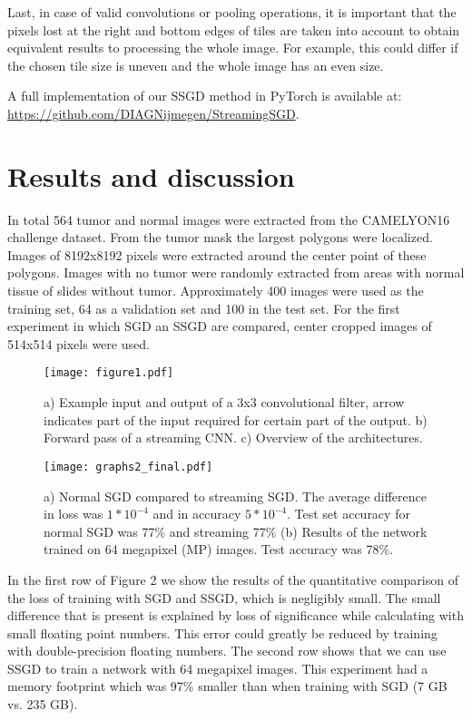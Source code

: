 \documentclass{article}
\begin{document}
Last, in case of valid convolutions or pooling operations, it is important that the pixels lost at the right and bottom edges of tiles are taken into account to obtain equivalent results to processing the whole image. For example, this could differ if the chosen tile size is uneven and the whole image has an even size.

A full implementation of our SSGD method in PyTorch is available at: \url{https://github.com/DIAGNijmegen/StreamingSGD}.

\section{Results and discussion}
In total 564 tumor and normal images were extracted from the CAMELYON16 challenge dataset\cite{doi:10.1001/jama.2017.14585}. From the tumor mask the largest polygons were localized. Images of 8192x8192 pixels were extracted around the center point of these polygons. Images with no tumor were randomly extracted from areas with normal tissue of slides without tumor. Approximately 400 images were used as the training set, 64 as a validation set and 100 in the test set. For the first experiment in which SGD an SSGD are compared, center cropped images of 514x514 pixels were used.

\begin{figure}[h]
    \centering
    \def\svgwidth{\columnwidth}
	\texttt{[image: figure1.pdf]}
    \caption{a) Example input and output of a 3x3 convolutional filter, arrow indicates part of the input required for certain part of the output. b) Forward pass of a streaming CNN. c) Overview of the architectures.}
\end{figure}

\begin{figure}[h]
    \centering
    \def\svgwidth{\columnwidth}
    \texttt{[image: graphs2\_final.pdf]}
    \caption{a) Normal SGD compared to streaming SGD. The average difference in loss was 
    $1*10^{-4}$ and in accuracy $5*10^{-4}$. Test set accuracy for normal SGD was 77\% and streaming 77\% (b) Results of the network trained on 64 megapixel (MP) images. Test accuracy was 78\%.}
\end{figure}

In the first row of Figure 2 we show the results of the quantitative comparison of the loss of training with SGD and SSGD, which is negligibly small. The small difference that is present is explained by loss of significance while calculating with small floating point numbers. This error could greatly be reduced by training with double-precision floating numbers. The second row shows that we can use SSGD to train a network with 64 megapixel images. This experiment had a memory footprint which was 97\% smaller than when training with SGD (7 GB vs. 235 GB). 
\end{document}
